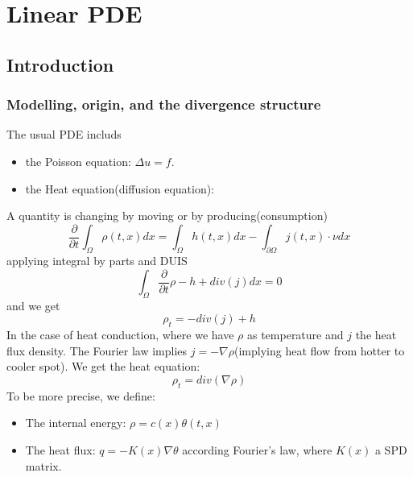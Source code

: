 \chapter{Linear PDE}
\section{Introduction}
\subsection{Modelling, origin, and the divergence structure}

\begin{example}
The usual PDE includs
\begin{itemize}
	\item the Poisson equation: $\Delta u = f$. 
	\item the Heat equation(diffusion equation): 
\end{itemize}	
\end{example}

\begin{example}
A quantity is changing by moving or by producing(consumption)
\begin{equation*}
	\frac{\partial}{\partial t} \int_\Omega \rho(t, x) dx = \int_\Omega h(t, x) dx  - \int_{\partial \Omega} j(t, x) \cdot \nu dx 
\end{equation*}
applying integral by parts and DUIS
\begin{equation*}
	\int_\Omega \frac{\partial}{\partial t} \rho - h + div(j) dx =0
\end{equation*}
and we get
\begin{equation*}
	\rho_t = -div(j) +h
\end{equation*}
In the case of heat conduction, where we have $\rho$ as temperature and $ j$ the heat flux density. The Fourier law implies $j = -\nabla \rho$(implying heat flow from hotter to cooler spot). We get the heat equation:
\begin{equation}
	\rho_t = div(\nabla \rho)
\end{equation}
To be more precise, we define:
\begin{itemize}
	\item The internal energy: $\rho = c(x)\theta(t, x)$
	\item The heat flux:  $ q = -K(x)\nabla \theta $ according Fourier's law, where $K(x)$ a SPD matrix.
\end{itemize}
\end{example}

